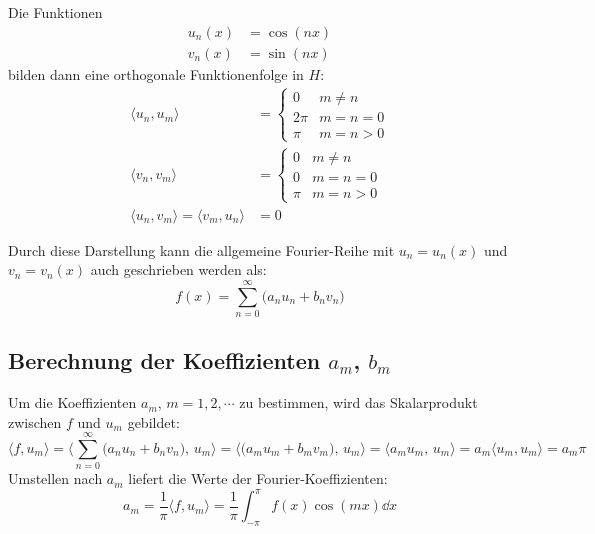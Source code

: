 			Die Funktionen
			\begin{align*}
				u_n(x) & = \cos(nx) \\
				v_n(x) & = \sin(nx)
			\end{align*}
			bilden dann eine orthogonale Funktionenfolge in \(H\):
			\begin{align*}
				\langle u_n, u_m \rangle                            & =
				\begin{cases}
					0    & m \neq n  \\
					2\pi & m = n = 0 \\
					\pi  & m = n > 0
				\end{cases}                                          \\
				\langle v_n, v_m \rangle                            & =
				\begin{cases}
					0   & m \neq n  \\
					0   & m = n = 0 \\
					\pi & m = n > 0
				\end{cases}                                           \\
				\langle u_n, v_m \rangle = \langle v_m, u_n \rangle & = 0
			\end{align*}

			Durch diese Darstellung kann die allgemeine Fourier-Reihe mit \( u_n = u_n(x) \) und \( v_n = v_n(x) \) auch geschrieben werden als:
			\begin{equation*}
				f(x) = \sum_{n = 0}^{\infty} \big( a_n u_n + b_n v_n \big)
			\end{equation*}

		\subsection{Berechnung der Koeffizienten \(a_m\), \(b_m\)}
			Um die Koeffizienten \( a_m \), \( m = 1, 2, \cdots \) zu bestimmen, wird das Skalarprodukt zwischen \(f\) und \( u_m \) gebildet:
			\begin{equation*}
				\langle f, u_m \rangle
				= \Bigg\langle \sum_{n = 0}^{\infty} \big( a_n u_n + b_n v_n \big),\, u_m \Bigg\rangle
				= \Big\langle \big( a_m u_m + b_m v_m \big),\, u_m \Big\rangle
				= \langle a_m u_m,\, u_m \rangle
				= a_m \langle u_m, u_m \rangle
				= a_m \pi
			\end{equation*}
			Umstellen nach \( a_m \) liefert die Werte der Fourier-Koeffizienten:
			\begin{equation*}
				a_m = \frac{1}{\pi} \langle f, u_m \rangle = \frac{1}{\pi} \int_{-\pi}^{\pi} \! f(x) \cos(mx) \dd{x}
			\end{equation*}

